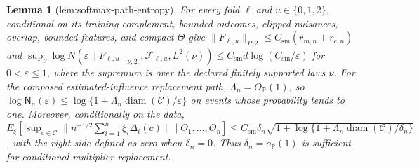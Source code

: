 \documentclass{article}
\newtheorem{lemma}{Lemma}
\begin{document}
\begin{lemma}[lem:softmax-path-entropy]\label{lem:softmax-path-entropy}
For every fold \(\ell\) and \(u\in\{0,1,2\}\), conditional on its training complement, bounded outcomes, clipped nuisances, overlap, bounded features, and compact \(\Theta\) give \(\|F_{\ell,u}\|_{P,2}\le C_{\mathrm{sm}}(r_{m,n}+r_{e,n})\) and \(\sup_{\nu}\log N(\varepsilon\|F_{\ell,u}\|_{\nu,2},\mathcal F_{\ell,u},L^2(\nu))\le C_{\mathrm{sm}}d\log(C_{\mathrm{sm}}/\varepsilon)\) for \(0<\varepsilon\le1\), where the supremum is over the declared finitely supported laws \(\nu\). For the composed estimated-influence replacement path, \(\Lambda_n=O_{\mathbb P}(1)\), so \(\log\mathsf N_n(\varepsilon)\le\log\{1+\Lambda_n\operatorname{diam}(\mathcal C)/\varepsilon\}\) on events whose probability tends to one. Moreover, conditionally on the data, \(E_\xi[\sup_{c\in\mathcal C}\|n^{-1/2}\sum_{i=1}^n\xi_i\Delta_i(c)\|\mid O_1,\ldots,O_n]\le C_{\mathrm{sm}}\delta_n\sqrt{1+\log\{1+\Lambda_n\operatorname{diam}(\mathcal C)/\delta_n\}}\), with the right side defined as zero when \(\delta_n=0\). Thus \(\delta_n=o_{\mathbb P}(1)\) is sufficient for conditional multiplier replacement.
\end{lemma}
\end{document}
